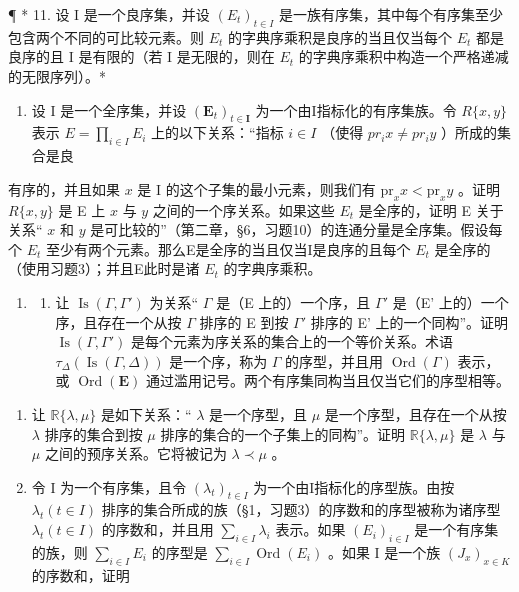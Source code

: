 ¶ * 11. 设 I 是一个良序集，并设 \((E_t)_{t \in I}\) 是一族有序集，其中每个有序集至少包含两个不同的可比较元素。则 \(E_t\) 的字典序乘积是良序的当且仅当每个 \(E_t\) 都是良序的且 I 是有限的（若 I 是无限的，则在 \(E_t\) 的字典序乘积中构造一个严格递减的无限序列）。*

\begin{enumerate}
\def\labelenumi{\arabic{enumi}.}
\setcounter{enumi}{11}
\tightlist
\item
  设 I 是一个全序集，并设 \((\mathbf{E}_{t})_{t\in\mathbf{I}}\) 为一个由I指标化的有序集族。令 \(R\{x,y\}\) 表示 \(E=\prod_{i\in I}E_{i}\) 上的以下关系：“指标 \(i\in I\) （使得 \(pr_{i}x\neq pr_{i}y\) ）所成的集合是良
\end{enumerate}

有序的，并且如果 \(x\) 是 I 的这个子集的最小元素，则我们有 \(\mathrm{pr}_x x < \mathrm{pr}_x y\) 。证明 \(R\{x, y\}\) 是 E 上 \(x\) 与 \(y\) 之间的一个序关系。如果这些 \(E_t\) 是全序的，证明 E 关于关系“ \(x\) 和 \(y\) 是可比较的”（第二章，§6，习题10）的连通分量是全序集。假设每个 \(E_t\) 至少有两个元素。那么E是全序的当且仅当I是良序的且每个 \(E_t\) 是全序的（使用习题3）；并且E此时是诸 \(E_t\) 的字典序乘积。

\begin{enumerate}
\def\labelenumi{\arabic{enumi}.}
\setcounter{enumi}{12}
\tightlist
\item
  \begin{enumerate}
  \def\labelenumii{(\alph{enumii})}
  \tightlist
  \item
    让 \(\operatorname{Is}(\Gamma, \Gamma')\) 为关系“ \(\Gamma\) 是（E 上的）一个序，且 \(\Gamma'\) 是（E' 上的）一个序，且存在一个从按 \(\Gamma\) 排序的 E 到按 \(\Gamma'\) 排序的 E' 上的一个同构”。证明 \(\operatorname{Is}(\Gamma, \Gamma')\) 是每个元素为序关系的集合上的一个等价关系。术语 \(\tau_{\Delta}(\operatorname{Is}(\Gamma, \Delta))\) 是一个序，称为 \(\Gamma\) 的序型，并且用 \(\operatorname{Ord}(\Gamma)\) 表示，或 \(\operatorname{Ord}(\mathbf{E})\) 通过滥用记号。两个有序集同构当且仅当它们的序型相等。
  \end{enumerate}
\end{enumerate}

\begin{enumerate}
\def\labelenumi{(\alph{enumi})}
\setcounter{enumi}{1}
\item
  让 \(\mathbb{R}\{\lambda, \mu\}\) 是如下关系：“ \(\lambda\) 是一个序型，且 \(\mu\) 是一个序型，且存在一个从按 \(\lambda\) 排序的集合到按 \(\mu\) 排序的集合的一个子集上的同构”。证明 \(\mathbb{R}\{\lambda, \mu\}\) 是 \(\lambda\) 与 \(\mu\) 之间的预序关系。它将被记为 \(\lambda \prec \mu\) 。
\item
  令 I 为一个有序集，且令 \((\lambda_{t})_{t\in I}\) 为一个由I指标化的序型族。由按 \(\lambda_{t}(t\in I)\) 排序的集合所成的族（§1，习题3）的序数和的序型被称为诸序型 \(\lambda_{t}(t\in I)\) 的序数和，并且用 \(\sum_{i\in I}\lambda_{i}\) 表示。如果 \((E_{i})_{i\in I}\) 是一个有序集的族，则 \(\sum_{i\in I}E_{i}\) 的序型是 \(\sum_{i\in I}\operatorname{Ord}(E_{i})\) 。如果 I 是一个族 \((J_{x})_{x\in K}\) 的序数和，证明
\end{enumerate}

